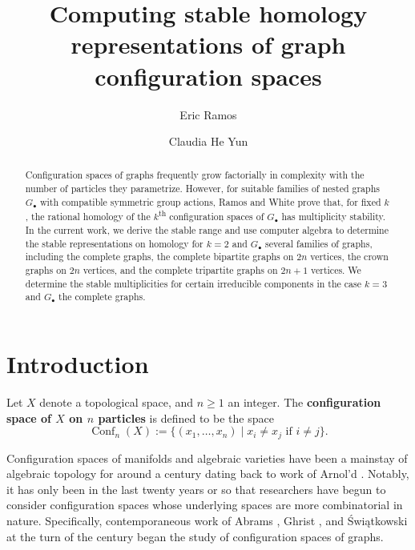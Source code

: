 \documentclass[12pt]{amsart}
\title{Computing stable homology representations of graph configuration spaces}
\author{Eric Ramos}
\author{Claudia He Yun}
\theoremstyle{definition}
\newcommand{\conf}{\operatorname{Conf}}
\begin{document}
\begin{abstract}
Configuration spaces of graphs frequently grow factorially in complexity with the number of particles they parametrize. However, for suitable families of nested graphs $G_\bullet$ with compatible symmetric group actions, Ramos and White prove that, for fixed $k$, the rational homology of the $k$\textsuperscript{th} configuration spaces of $G_\bullet$ has multiplicity stability. In the current work, we derive the stable range and use computer algebra to determine the stable representations on homology for $k=2$ and $G_\bullet$ several families of graphs, including the complete graphs, the complete bipartite graphs on $2n$ vertices, the crown graphs on $2n$ vertices, and the complete tripartite graphs on $2n+1$ vertices. We determine the stable multiplicities for certain irreducible components in the case $k=3$ and $G_\bullet$ the complete graphs.
\end{abstract}
	
\maketitle

\section{Introduction}

Let $X$ denote a topological space, and $n \geq 1$ an integer. The \textbf{configuration space of $X$ on $n$ particles} is defined to be the space
\[
\conf_n(X) := \{(x_1,\ldots,x_n) \mid x_i \neq x_j \text{ if } i \neq j\}.
\]

Configuration spaces of manifolds and algebraic varieties have been a mainstay of algebraic topology for around a century dating back to work of Arnol'd \cite{Arn}. Notably, it has only been in the last twenty years or so that researchers have begun to consider configuration spaces whose underlying spaces are more combinatorial in nature. Specifically, contemporaneous work of Abrams \cite{Abr}, Ghrist \cite{Ghr}, and {\'S}wi{\k{a}}tkowski \cite{Swia} at the turn of the century began the study of configuration spaces of graphs.
\end{document}

